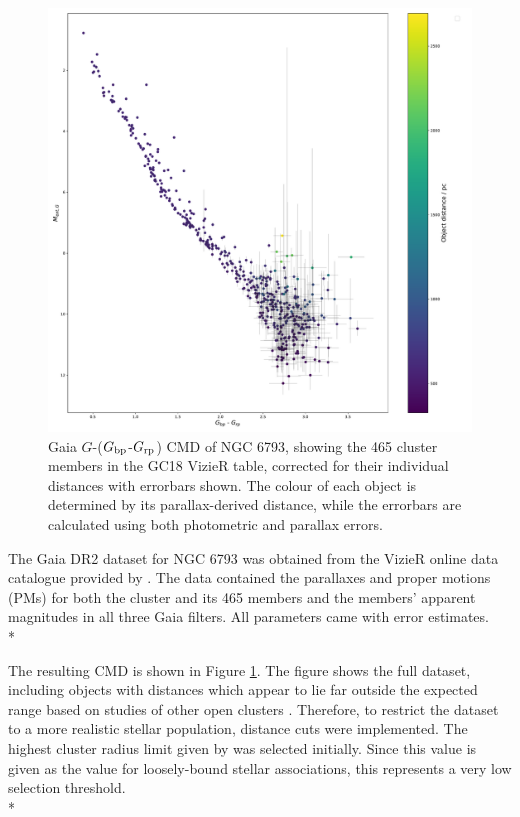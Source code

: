\documentclass[12pt, a4paper]{report}
\begin{document}
\begin{figure}[h!]
\begin{center}
\includegraphics[width=1.0\textwidth]{../NGC_6793_CMD_observational_errorbars_vizier_465.pdf}
\caption{Gaia $G$-($G_{\textnormal{bp}}$-$G_{\textnormal{rp}}$) CMD of NGC 6793, showing the 465 cluster members in the GC18 VizieR table, corrected for their individual distances with errorbars shown. The colour of each object is determined by its parallax-derived distance, while the errorbars are calculated using both photometric and parallax errors.}
\label{NGC_6793_obs_only_465}
\end{center}
\end{figure}

The Gaia DR2 dataset for NGC 6793 was obtained from the VizieR online data catalogue provided by \cite{2018A&A...616A..10G}. The data contained the parallaxes and proper motions (PMs) for both the cluster and its 465 members and the members' apparent magnitudes in all three Gaia filters. All parameters came with error estimates.\\*

The resulting CMD is shown in Figure \ref{NGC_6793_obs_only_465}. The figure shows the full dataset, including objects with distances which appear to lie far outside the expected range based on studies of other open clusters \citep{2006A&A...456..523S}. Therefore, to restrict the dataset to a more realistic stellar population, distance cuts were implemented. The highest cluster radius limit given by \cite{2006A&A...456..523S} was selected initially. Since this value is given as the value for loosely-bound stellar associations, this represents a very low selection threshold.\\*
\end{document}
